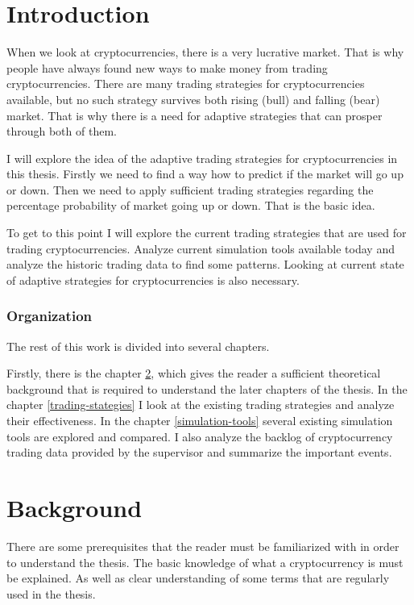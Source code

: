 
\chapter{Introduction}

When we look at cryptocurrencies, there is a very lucrative market. That is why people have always found new ways to make money from trading cryptocurrencies. There are many trading strategies for cryptocurrencies available, but no such strategy survives both rising (bull) and falling (bear) market. That is why there is a need for adaptive strategies that can prosper through both of them.

I will explore the idea of the adaptive trading strategies for cryptocurrencies in this thesis. Firstly we need to find a way how to predict if the market will go up or down. Then we need to apply sufficient trading strategies regarding the percentage probability of market going up or down. That is the basic idea.

To get to this point I will explore the current trading strategies that are used for trading cryptocurrencies. Analyze current simulation tools available today and analyze the historic trading data to find some patterns. Looking at current state of adaptive strategies for cryptocurrencies is also necessary.

\subsection*{Organization}

The rest of this work is divided into several chapters.

Firstly, there is the chapter \ref{background}, which gives the reader a sufficient theoretical background that is required to understand the later chapters of the thesis. In the chapter \ref{trading-stategies} I look at the existing trading strategies and analyze their effectiveness. In the chapter \ref{simulation-tools} several existing simulation tools are explored and compared. I also analyze the backlog of cryptocurrency trading data provided by the supervisor and summarize the important events.


\chapter{Background}
\label{background}

There are some prerequisites that the reader must be familiarized with in order to understand the thesis. The basic knowledge of what a cryptocurrency is must be explained. As well as clear understanding of some terms that are regularly used in the thesis.

